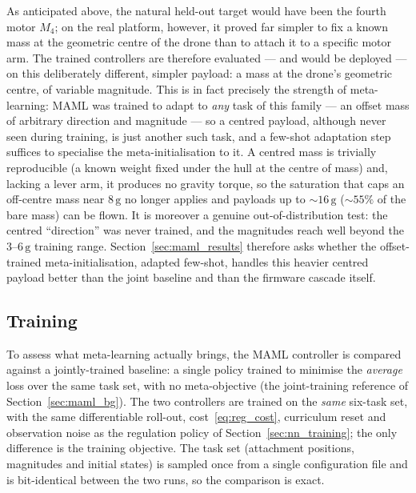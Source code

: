 \documentclass[11pt,a4paper]{article}
\theoremstyle{remark}
\numberwithin{equation}{section}
\begin{document}
As anticipated above, the natural held-out target would have been the fourth
motor $M_4$; on the real platform, however, it proved far simpler to fix a known
mass at the geometric centre of the drone than to attach it to a specific motor
arm. The trained controllers are therefore evaluated --- and would be deployed
--- on this deliberately different, simpler payload: a mass at the drone's
geometric centre, of variable magnitude. This is in fact precisely the strength
of meta-learning: MAML was trained to adapt to \emph{any} task of this family ---
an offset mass of arbitrary direction and magnitude --- so a centred payload,
although never seen during training, is just another such task, and a few-shot
adaptation step suffices to specialise the meta-initialisation to it. A
centred mass is trivially reproducible (a known weight fixed under the hull at
the centre of mass) and, lacking a lever arm, it produces no gravity torque, so
the saturation that caps an off-centre mass near $8\,\mathrm{g}$ no longer
applies and payloads up to $\sim16\,\mathrm{g}$ ($\sim55\%$ of the bare mass)
can be flown. It is moreover a genuine out-of-distribution test: the centred
``direction'' was never trained, and the magnitudes reach well beyond the
$3$--$6\,\mathrm{g}$ training range. Section~\ref{sec:maml_results} therefore
asks whether the offset-trained meta-initialisation, adapted few-shot, handles
this heavier centred payload better than the joint baseline and than the
firmware cascade itself.

\subsection{Training}\label{sec:maml_training}

To assess what meta-learning actually brings, the MAML controller is compared
against a jointly-trained baseline: a single policy trained to minimise the
\emph{average} loss over the same task set, with no meta-objective (the
joint-training reference of Section~\ref{sec:maml_bg}). The two controllers are
trained on the \emph{same} six-task set, with the same
differentiable roll-out, cost~\eqref{eq:reg_cost}, curriculum reset and
observation noise as the regulation policy of Section~\ref{sec:nn_training}; the
only difference is the training objective. The task set (attachment positions,
magnitudes and initial states) is sampled once from a single configuration file
and is bit-identical between the two runs, so the comparison is exact.
\end{document}

